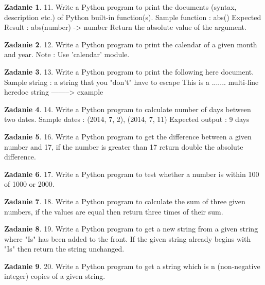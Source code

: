 \documentclass[11pt]{article}
\theoremstyle{definition}
\newtheorem{zadanie}{Zadanie}
\begin{document}
\begin{zadanie}
11. Write a Python program to print the documents (syntax, description etc.) of Python built-in function(s).
Sample function : abs()
Expected Result :
abs(number) -> number
Return the absolute value of the argument.
\end{zadanie}

\begin{zadanie}
12. Write a Python program to print the calendar of a given month and year.
Note : Use 'calendar' module.
\end{zadanie}

\begin{zadanie}
13. Write a Python program to print the following here document.
Sample string :
a string that you "don't" have to escape
This
is a ....... multi-line
heredoc string --------> example
\end{zadanie}

\begin{zadanie}
14. Write a Python program to calculate number of days between two dates.
Sample dates : (2014, 7, 2), (2014, 7, 11)
Expected output : 9 days
\end{zadanie}

\begin{zadanie}
16. Write a Python program to get the difference between a given number and 17, if the number is greater than 17 return double the absolute difference.
\end{zadanie}

\begin{zadanie}
17. Write a Python program to test whether a number is within 100 of 1000 or 2000.
\end{zadanie}

\begin{zadanie}
18. Write a Python program to calculate the sum of three given numbers, if the values are equal then return three times of their sum.
\end{zadanie}

\begin{zadanie}
19. Write a Python program to get a new string from a given string where "Is" has been added to the front. If the given string already begins with "Is" then return the string unchanged.
\end{zadanie}

\begin{zadanie}
20. Write a Python program to get a string which is n (non-negative integer) copies of a given string.
\end{zadanie}
\end{document}
